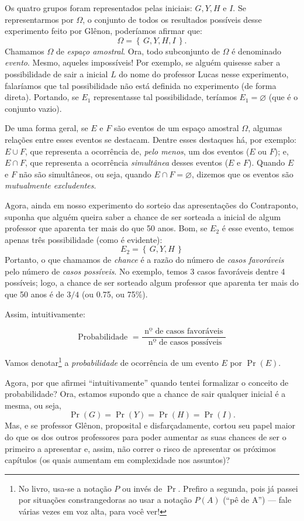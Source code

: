 \documentclass[12pt]{article}
\theoremstyle{definition}
\begin{document}
Os quatro grupos foram representados pelas iniciais: $G, Y, H\text{ e } I$.
Se representarmos por $\Omega$, o conjunto de todos os resultados possíveis 
desse experimento feito por Glênon, poderíamos afirmar que:
\[
  \Omega = \left\{\,G, Y, H, I\,\right\}.
\] 
Chamamos $\Omega$ de \textit{espaço amostral}.
Ora, todo subconjunto de $\Omega$ é denominado \textit{evento}.
Mesmo, aqueles impossíveis! 
Por exemplo, se alguém quisesse saber a possibilidade de sair a inicial $L$ do
nome do professor Lucas nesse experimento, falaríamos que tal possibilidade não
está definida no experimento (de forma direta).
Portando, se $E_1$ representasse tal possibilidade, teríamos $E_1 = \varnothing$
(que é o conjunto vazio).

De uma forma geral, se $E$ e $F$ são eventos de um espaço amostral $\Omega$, 
algumas relações entre esses eventos se destacam.
Dentre esses destaques há, por exemplo: $E\cup F$, que representa a ocorrência
de, \textit{pelo menos}, um dos eventos ($E$ ou $F$); e, $E \cap F$, que 
representa a ocorrência \textit{simultânea} desses eventos ($E$ e $F$).
Quando $E$ e $F$ não são simultâneos, ou seja, quando $E\cap F = \varnothing$,
dizemos que os eventos são \textit{mutualmente excludentes}.

Agora, ainda em nosso experimento do sorteio das apresentações do Contraponto,
suponha que alguém queira saber a chance de ser sorteada a inicial de algum 
professor que aparenta ter mais do que 50 anos.
Bom, se $E_2$ é esse evento, temos apenas três possibilidade (como é evidente): 
\[
  E_2 = \left\{\, G, Y, H \,\right\} 
\]
Portanto, o que chamamos de \textit{chance} é a razão do número de 
\textit{casos favoráveis} pelo número de \textit{casos possíveis}.
No exemplo, temos 3 casos favoráveis dentre 4 possíveis; logo, a chance de ser
sorteado algum professor que aparenta ter mais do que 50 anos é de $3/4$ (ou
0.75, ou 75\%).

Assim, intuitivamente:

\[
  \text{Probabilidade } = 
		\frac
		 {
			 \text{ nº de casos favoráveis }
			}
			{
			 \text{ nº de casos possíveis}
			}
\]

Vamos denotar\footnote{No livro, usa-se a notação $P$ ou invés de $\Pr$. 
Prefiro a segunda, pois já passei por situações constrangedoras ao usar a 
notação $P(A)$ (``pê de A'') --- fale várias vezes em voz alta, para você ver!} 
a \textit{probabilidade} de ocorrência de um evento $E$ por $\Pr{(E)}$. 

Agora, por que afirmei ``intuitivamente'' quando tentei formalizar o conceito de
probabilidade?
Ora, estamos supondo que a chance de sair qualquer inicial é a mesma, ou seja, 
\[
  \Pr{(G)} = \Pr{(Y)} = \Pr{(H)} = \Pr{(I)} .
\]
Mas, e se professor Glênon, proposital e disfarçadamente, cortou seu papel maior
do que os dos outros professores para poder aumentar as suas chances de ser o 
primeiro a apresentar e, assim, não correr o risco de apresentar os próximos 
capítulos (os quais aumentam em complexidade nos assuntos)?
\end{document}
